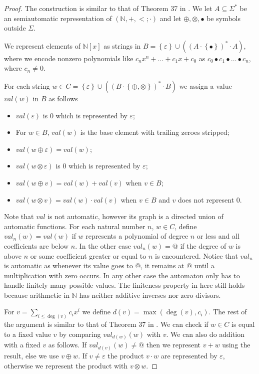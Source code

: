 \documentclass[british,a4paper,]{scrartcl}
\theoremstyle{definition}
\theoremstyle{remark}
\let\epsilon\varepsilon
\newcommand{\set}[1]{\left\{ #1 \right\}}
\newcommand{\N}{\mathbb{N}}
\begin{document}
\begin{proof}
    The construction is similar to that of Theorem 37 in \autocite{semiauto}.
    We let \(A \subseteq \Sigma^*\) be an semiautomatic representation of \((\N, +, <;\cdot)\)
    and let \(\oplus, \otimes, \bullet\) be symbols outside \(\Sigma\).

    We represent elements of \(\N[x]\) as strings in \(B = \set{\epsilon}\cup \left(\left(A\cdot \set{\bullet}\right)^*\cdot A\right)\),
    where we encode nonzero polynomials like
    \(c_nx^n + \dots + c_1x + c_0\) as \(c_0\bullet c_1\bullet\dots\bullet c_n\),
    where \(c_n \ne 0\).

    For each string \(w \in C = \set{\epsilon}\cup\left( \left(B\cdot \set{\oplus,\otimes} \right)^*\cdot B \right)\)
    we assign a value \(val(w)\) in \(B\) as follows
    \begin{itemize}
        \item \(val(\epsilon)\) is \(0\) which is represented by \(\epsilon\);
        \item For \(w \in B\),
            \(val(w)\) is the base element with trailing zeroes stripped;
        \item \(val(w\oplus\epsilon) = val(w)\);
        \item \(val(w\otimes\epsilon)\) is \(0\) which is represented by \(\epsilon\);
        \item \(val(w\oplus v) = val(w) + val(v)\) when \(v\in B\);
        \item \(val(w\otimes v) = val(w)\cdot val(v)\) when \(v\in B\) and \(v\) does not represent \(0\).
    \end{itemize}
    Note that \(val\) is not automatic, however its graph is a directed union of automatic functions.
    For each natural number \(n\), \(w\in C\), define
    \(val_n(w) = val(w)\) if \(w\) represents a polynomial of degree \(n\) or less
    and all coefficients are below \(n\).
    In the other case \(val_n(w) = @\) if the degree of \(w\) is above \(n\) or
    some coefficient greater or equal to \(n\) is encountered.
    Notice that \(val_n\) is automatic as whenever its value goes to \(@\), it remains at \(@\) until a multiplication with zero occurs.
    In any other case the automaton only has to handle finitely many possible values.
    The finiteness property in here still holds because arithmetic in \(\N\) has neither additive inverses nor zero divisors.

    For \(v = \sum_{i \leq \deg(v)} c_i x^i\) we define \(d(v) = \max(\deg(v), c_i)\).
    The rest of the argument is similar to that of Theorem 37 in \autocite{semiauto}.
    We can check if
    \(w\in C\) is equal to a fixed value \(v\) by comparing \(val_{d(w)}(w)\) with \(v\).
    We can also do addition with a fixed \(v\) as follows.
    If \(val_{d(v)}(w) \ne @\) then we represent \(v+w\) using the result, else we use \(v\oplus w\).
    If \(v\ne \epsilon\) the product \(v\cdot w\) are represented by \(\epsilon\), otherwise we represent the product with \(v\otimes w\).
\end{proof}
\end{document}
